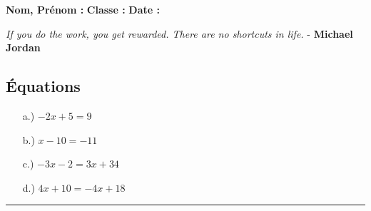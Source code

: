 \documentclass[11pt]{article}
\newcommand{\horrule}[1]{\rule{\linewidth}{#1}} %
\begin{document}

\newtheorem{Definition}{Définition}
\newtheorem{Theorem}{Théorème}
\newtheorem{Proposition}{Propriété}

\renewcommand{\labelitemi}{$\bullet$}
\renewcommand{\labelitemii}{$\circ$}

\setlength{\columnseprule}{1pt}

\textbf{Nom, Prénom :} \hspace{8cm} \textbf{Classe :} \hspace{3cm} \textbf{Date :}\\
\vspace{-0.8cm}
\begin{center}
  \textit{If you do the work, you get rewarded. There are no shortcuts in life.}  - \textbf{Michael Jordan}
\end{center}
\vspace{-0.8cm}

\subsection*{Équations}
\begin{multicols}{2}\noindent
  \begin{enumerate}
  \item[a.)] $-2x + 5 = 9$
  \item[b.)] $x - 10 = -11$
  \item[c.)] $-3x - 2 = 3x + 34$
  \item[d.)] $4x + 10 = -4x + 18$
    \end{enumerate}
\end{multicols}

\vspace{-0.4cm}
\horrule{1px}
\vspace{-0.8cm}
\end{document}
